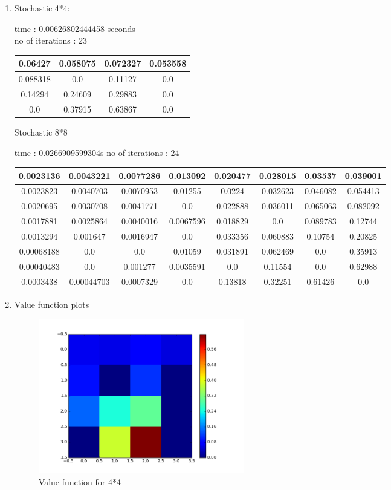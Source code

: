 \documentclass{article}
\begin{document}
\begin{enumerate}[label=(\alph*)]
\item

Stochastic 4*4:


time : 0.00626802444458 seconds\\
no of iterations : 23 

\begin{tabular}{|c|c|c|c|}\hline

0.06427 & 0.058075 & 0.072327 & 0.053558 \\\hline
0.088318 & 0.0 & 0.11127 & 0.0 \\\hline
0.14294 & 0.24609 & 0.29883 & 0.0 \\\hline
0.0 & 0.37915 & 0.63867 & 0.0\\\hline
\end{tabular}

Stochastic 8*8

time : 0.0266909599304s 
no of iterations : 24 

\begin{tabular}{|c|c|c|c|c|c|c|c|}\hline
0.0023136 & 0.0043221 & 0.0077286 & 0.013092 & 0.020477 & 0.028015 & 0.03537 & 0.039001 \\\hline
0.0023823 & 0.0040703 & 0.0070953 & 0.01255 & 0.0224 & 0.032623 & 0.046082 & 0.054413 \\\hline
0.0020695 & 0.0030708 & 0.0041771 & 0.0 & 0.022888 & 0.036011 & 0.065063 & 0.082092 \\\hline
0.0017881 & 0.0025864 & 0.0040016 & 0.0067596 & 0.018829 & 0.0 & 0.089783 & 0.12744 \\\hline
0.0013294 & 0.001647 & 0.0016947 & 0.0 & 0.033356 & 0.060883 & 0.10754 & 0.20825 \\\hline
0.00068188 & 0.0 & 0.0 & 0.01059 & 0.031891 & 0.062469 & 0.0 & 0.35913 \\\hline
0.00040483 & 0.0 & 0.001277 & 0.0035591 & 0.0 & 0.11554 & 0.0 & 0.62988 \\\hline
0.0003438 & 0.00044703 & 0.0007329 & 0.0 & 0.13818 & 0.32251 & 0.61426 & 0.0\\\hline
\end{tabular}


\item
Value function plots \\
\begin{figure}[H]
\centering
\includegraphics[width=90mm]{4_4_stochastic_val_iter.png}
\caption{Value function for 4*4 \label{overflow}}
\end{figure}


\end{enumerate}
\end{document}
